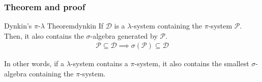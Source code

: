 \subsubsection{Theorem and proof}
\begin{theorem}{Dynkin's $\pi$-$\lambda$ Theorem}{dynkin}
    If $\mathcal{D}$ is a $\lambda$-system containing the $\pi$-system $\mathcal{P}$. Then, it also contains the $\sigma$-algebra generated by $\mathcal{P}$. 
    \begin{align*}
        \mathcal{P} \subseteq \mathcal{D} \implies \sigma(\mathcal{P}) \subseteq \mathcal{D}
    \end{align*}

    In other words, if a $\lambda$-system contains a $\pi$-system, it also contains the smallest $\sigma$-algebra containing the $\pi$-system.
\end{theorem}

